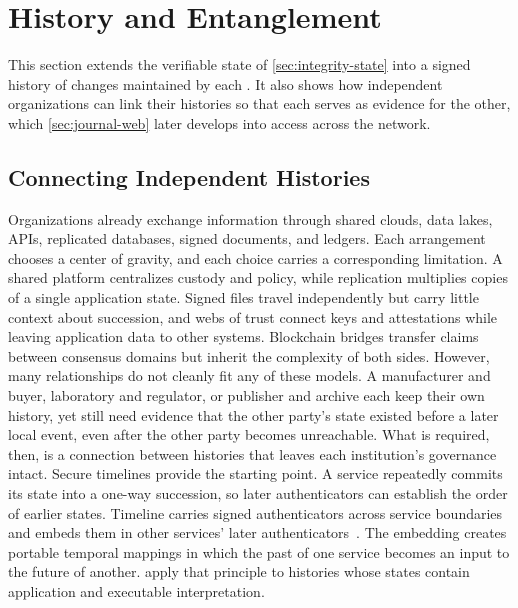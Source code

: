 \section{History and Entanglement}
\label{sec:history-entanglement}

This section extends the verifiable state of \cref{sec:integrity-state} into a signed history of changes maintained by each . It also shows how independent organizations can link their histories so that each serves as evidence for the other, which \cref{sec:journal-web} later develops into access across the network.

\subsection{Connecting Independent Histories}

Organizations already exchange information through shared clouds, data lakes, APIs, replicated databases, signed documents, and ledgers. Each arrangement chooses a center of gravity, and each choice carries a corresponding limitation. A shared platform centralizes custody and policy, while replication multiplies copies of a single application state. Signed files travel independently but carry little context about succession, and webs of trust connect keys and attestations while leaving application data to other systems. Blockchain bridges transfer claims between consensus domains but inherit the complexity of both sides. However, many relationships do not cleanly fit any of these models. A manufacturer and buyer, laboratory and regulator, or publisher and archive each keep their own history, yet still need evidence that the other party's state existed before a later local event, even after the other party becomes unreachable. What is required, then, is a connection between histories that leaves each institution's governance intact. Secure timelines provide the starting point. A service repeatedly commits its state into a one-way succession, so later authenticators can establish the order of earlier states. Timeline  carries signed authenticators across service boundaries and embeds them in other services' later authenticators~\cite{Maniatis2002timeline}. The embedding creates portable temporal mappings in which the past of one service becomes an input to the future of another.   apply that principle to histories whose states contain application  and executable interpretation.


